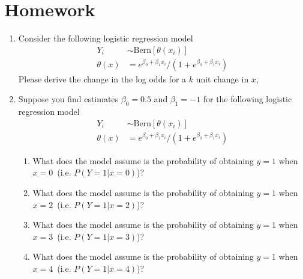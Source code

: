 \section{Homework}

\begin{enumerate}
    \item Consider the following logistic regression model 
    \begin{align}
        Y_{i} & \sim  \text{Bern}[\theta(x_{i})] \\ 
              \theta(x) &= e^{\beta_{0} + \beta_{1}x_{i}} \Big / (1+e^{\beta_{0} + \beta_{1}x_{i}})
    \end{align}
    Please derive the change in the log odds for a $k$ unit change in $x$,
    
    \item Suppose you find estimates $\beta_{0} = 0.5$ and $\beta_{1} = -1$ for the following logistic regression model 
        \begin{align}
        Y_{i} & \sim  \text{Bern}[\theta(x_{i})] \\ 
              \theta(x) &= e^{\beta_{0} + \beta_{1}x_{i}} \Big / (1+e^{\beta_{0} + \beta_{1}x_{i}})
        \end{align}
        \begin{enumerate}
            \item What does the model assume is the probability of obtaining $y=1$ when $x=0$~(i.e. $P(Y=1 | x=0)$)? 
            
            \item What does the model assume is the probability of obtaining $y=1$ when $x=2$~(i.e. $P(Y=1 | x=2)$)? 
        
            \item What does the model assume is the probability of obtaining $y=1$ when $x=3$~(i.e. $P(Y=1 | x=3)$)? 
            
            \item What does the model assume is the probability of obtaining $y=1$ when $x=4$~(i.e. $P(Y=1 | x=4)$)? 
            

\end{enumerate}
\end{enumerate}
